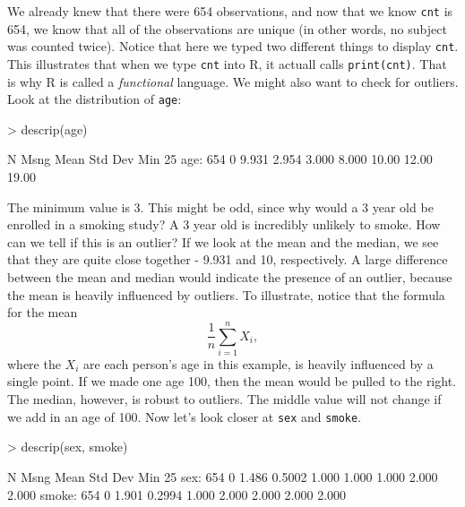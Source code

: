\documentclass[landscape]{article}
\renewenvironment{Schunk}{\vspace{\topsep}}{\vspace{\topsep}}
\begin{document}
We already knew that there were 654 observations, and now that we know \texttt{cnt} is 654, we know that all of the observations are unique (in other words, no subject was counted twice). Notice that here we typed two different things to display \texttt{cnt}. This illustrates that when we type \texttt{cnt} into R, it actuall calls \texttt{print(cnt)}. That is why R is called a \emph{functional} language.
\newline \indent We might also want to check for outliers. Look at the distribution of \texttt{age}:
\begin{Schunk}
\begin{Sinput}
> descrip(age)
\end{Sinput}
\begin{Soutput}
       N     Msng  Mean      Std Dev    Min       25%
age:     654     0   9.931     2.954     3.000     8.000     10.00     12.00     19.00  
\end{Soutput}
\end{Schunk}
The minimum value is 3. This might be odd, since why would a 3 year old be enrolled in a smoking study? A 3 year old is incredibly unlikely to smoke. How can we tell if this is an outlier? If we look at the mean and the median, we see that they are quite close together - 9.931 and 10, respectively. A large difference between the mean and median would indicate the presence of an outlier, because the mean is heavily influenced by outliers. To illustrate, notice that the formula for the mean \begin{displaymath} \frac{1}{n}\sum_{i=1}^n X_i, \end{displaymath} where the $X_i$ are each person's age in this example, is heavily influenced by a single point. If we made one age 100, then the mean would be pulled to the right. The median, however, is robust to outliers. The middle value will not change if we add in an age of 100. 
\newline \indent Now let's look closer at \texttt{sex} and \texttt{smoke}.
\begin{Schunk}
\begin{Sinput}
> descrip(sex, smoke)
\end{Sinput}
\begin{Soutput}
         N     Msng  Mean      Std Dev    Min       25%
  sex:     654     0   1.486     0.5002    1.000     1.000     1.000     2.000     2.000  
smoke:     654     0   1.901     0.2994    1.000     2.000     2.000     2.000     2.000  
\end{Soutput}
\end{Schunk}
\end{document}
